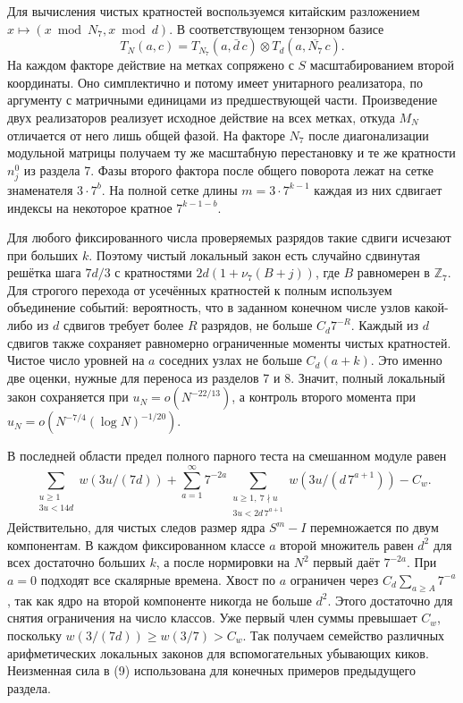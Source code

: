 \documentclass[11pt,a4paper]{article}
\newcommand{\Z}{\mathbb Z}
\begin{document}
Для вычисления чистых кратностей воспользуемся китайским разложением $x\mapsto(x\bmod N_7,x\bmod d)$. В соответствующем тензорном базисе
\[
 T_N(a,c)=T_{N_7}(a,\bar d\,c)\otimes T_d(a,\overline{N_7}\,c).
\]
На каждом факторе действие на метках сопряжено с $S$ масштабированием второй координаты. Оно симплектично и потому имеет унитарного реализатора, по аргументу с матричными единицами из предшествующей части. Произведение двух реализаторов реализует исходное действие на всех метках, откуда $M_N$ отличается от него лишь общей фазой. На факторе $N_7$ после диагонализации модульной матрицы получаем ту же масштабную перестановку и те же кратности $n_j^0$ из раздела 7. Фазы второго фактора после общего поворота лежат на сетке знаменателя $3\cdot7^b$. На полной сетке длины $m=3\cdot7^{k-1}$ каждая из них сдвигает индексы на некоторое кратное $7^{k-1-b}$.

Для любого фиксированного числа проверяемых разрядов такие сдвиги исчезают при больших $k$. Поэтому чистый локальный закон есть случайно сдвинутая решётка шага $7d/3$ с кратностями $2d(1+\nu_7(B+j))$, где $B$ равномерен в $\Z_7$. Для строгого перехода от усечённых кратностей к полным используем объединение событий: вероятность, что в заданном конечном числе узлов какой-либо из $d$ сдвигов требует более $R$ разрядов, не больше $C_d 7^{-R}$. Каждый из $d$ сдвигов также сохраняет равномерно ограниченные моменты чистых кратностей. Чистое число уровней на $a$ соседних узлах не больше $C_d(a+k)$. Это именно две оценки, нужные для переноса из разделов 7 и 8. Значит, полный локальный закон сохраняется при $u_N=o(N^{-22/13})$, а контроль второго момента при $u_N=o(N^{-7/4}(\log N)^{-1/20})$.

В последней области предел полного парного теста на смешанном модуле равен
\[
  \sum_{\substack{u\ge1\\3u<14d}} w(3u/(7d))
   +\sum_{a=1}^\infty 7^{-2a}
      \sum_{\substack{u\ge1,\ 7\nmid u\\3u<2d\,7^{a+1}}}
         w(3u/(d\,7^{a+1}))
    - C_w .
\]
Действительно, для чистых следов размер ядра $S^m-I$ перемножается по двум компонентам. В каждом фиксированном классе $a$ второй множитель равен $d^2$ для всех достаточно больших $k$, а после нормировки на $N^2$ первый даёт $7^{-2a}$. При $a=0$ подходят все скалярные времена. Хвост по $a$ ограничен через $C_d\sum_{a\ge A}7^{-a}$, так как ядро на второй компоненте никогда не больше $d^2$. Этого достаточно для снятия ограничения на число классов. Уже первый член суммы превышает $C_w$, поскольку $w(3/(7d))\ge w(3/7)>C_w$. Так получаем семейство различных арифметических локальных законов для вспомогательных убывающих киков. Неизменная сила в (9) использована для конечных примеров предыдущего раздела.
\end{document}
